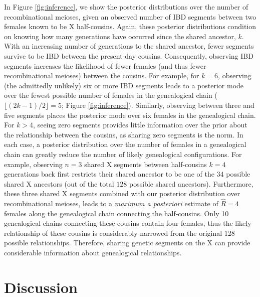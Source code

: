 \documentclass[9pt,twocolumn,twoside]{gsajnl}
\begin{document}
In Figure \ref{fig:inference}, we show the posterior distributions over the
number of recombinational meioses, given an observed number of IBD segments
between two females known to be X half-cousins. Again, these posterior
distributions condition on knowing how many generations have occurred since the
shared ancestor, $k$.  With an increasing number of generations to the shared
ancestor, fewer segments survive to be IBD between the present-day cousins.
Consequently, observing IBD segments increases the likelihood of fewer females
(and thus fewer recombinational meioses) between the cousins. For example, for
$k=6$, observing (the admittedly unlikely) six or more IBD segments leads to a
posterior mode over the fewest possible number of females in the genealogical
chain ($\lfloor (2k-1)/2 \rfloor = 5$; Figure \ref{fig:inference}).  Similarly,
observing between three and five segments places the posterior mode over six
females in the genealogical chain. For $k>4$, seeing zero segments provides
little information over the prior about the relationship between the cousins,
as sharing zero segments is the norm. In each case, a posterior distribution
over the number of females in a genealogical chain can greatly reduce the
number of likely genealogical configurations. For example, observing $n=3$
shared X segments between half-cousins $k=4$ generations back first restricts
their shared ancestor to be one of the $34$ possible shared X ancestors (out of
the total $128$ possible shared ancestors). Furthermore, these three shared X
segments combined with our posterior distribution over recombinational meioses,
leads to a \emph{maximum a posteriori} estimate of $\hat{R} = 4$ females along
the genealogical chain connecting the half-cousins. Only 10 genealogical chains
connecting these cousins contain four females, thus the likely relationship of
these cousins is considerably narrowed from the original 128 possible
relationships. Therefore, sharing genetic segments on the X can provide
considerable information about genealogical relationships.

\section*{Discussion}
\end{document}
